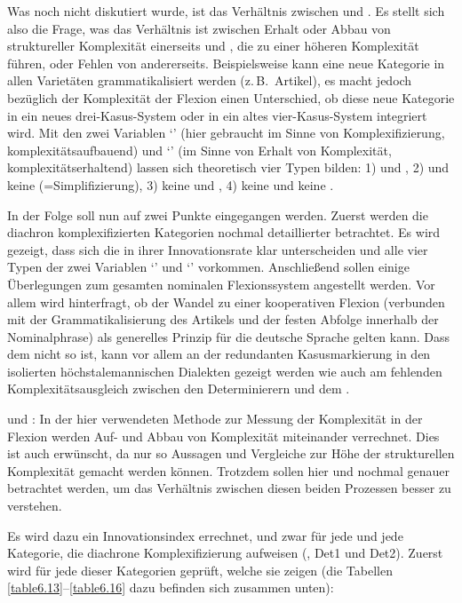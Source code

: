 Was noch nicht diskutiert wurde, ist das Verhältnis zwischen  und . Es stellt sich also die Frage, was das Verhältnis ist zwischen Erhalt oder Abbau von struktureller Komplexität einerseits und , die zu einer höheren Komplexität führen, oder Fehlen von  andererseits. Beispielsweise kann eine neue Kategorie in allen Varietäten grammatikalisiert werden (z.\,B.\ Artikel), es macht jedoch bezüglich der Komplexität der Flexion einen Unterschied, ob diese neue Kategorie in ein neues drei-Kasus-System oder in ein altes vier-Kasus-System integriert wird. Mit den zwei Variablen ‘’ (hier gebraucht im Sinne von Komplexifizierung, komplexitätsaufbauend) und ‘’ (im Sinne von Erhalt von Komplexität, komplexitätserhaltend) lassen sich theoretisch vier Typen bilden: 1)  und , 2)  und keine  (=Simplifizierung), 3) keine  und , 4) keine  und keine .

In der Folge soll nun auf zwei Punkte eingegangen werden. Zuerst werden die diachron komplexifizierten Kategorien nochmal detaillierter betrachtet. Es wird gezeigt, dass sich die  in ihrer Innovationsrate klar unterscheiden und alle vier Typen der zwei Variablen ‘’ und ‘’ vorkommen. Anschließend sollen einige Überlegungen zum gesamten nominalen Flexionssystem angestellt werden. Vor allem wird hinterfragt, ob der Wandel zu einer kooperativen Flexion (verbunden mit der Grammatikalisierung des Artikels und der festen Abfolge innerhalb der Nominalphrase) als generelles Prinzip für die deutsche Sprache gelten kann. Dass dem nicht so ist, kann vor allem an der redundanten Kasusmarkierung in den isolierten höchstalemannischen Dialekten gezeigt werden wie auch am fehlenden Komplexitätsausgleich zwischen den Determinierern und dem .

{ und :} In der hier verwendeten Methode zur Messung der Komplexität in der Flexion werden Auf- und Abbau von Komplexität miteinander verrechnet. Dies ist auch erwünscht, da nur so Aussagen und Vergleiche zur Höhe der strukturellen Komplexität gemacht werden können. Trotzdem sollen hier  und  nochmal genauer betrachtet werden, um das Verhältnis zwischen diesen beiden Prozessen besser zu verstehen.

Es wird dazu ein Innovationsindex errechnet, und zwar für jede  und jede Kategorie, die diachrone Komplexifizierung aufweisen (, Det1 und Det2). Zuerst wird für jede dieser Kategorien geprüft, welche  sie zeigen (die Tabellen \ref{table6.13}–\ref{table6.16} dazu befinden sich zusammen unten):

